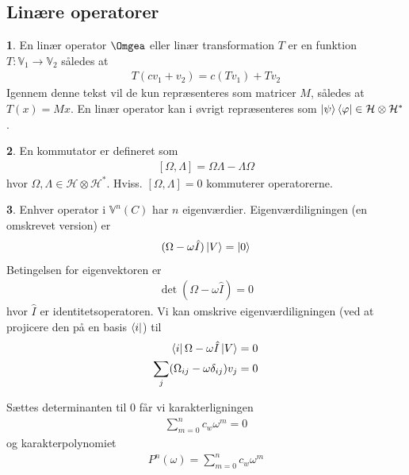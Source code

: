 \documentclass[12pt]{article}
\theoremstyle{definition}
\theoremstyle{remark}
\theoremstyle{definition}
\newtheorem{definition}{}[]
\renewcommand{\H}{\mathcal H}
\newcounter{theo}[section]\setcounter{theo}{0}
\numberwithin{equation}{section}
\begin{document}
\subsection{Linære operatorer}
\begin{definition}
En linær operator $\Omgea$ eller linær transformation $T$ er en
funktion $T:\mathbb V_1 \to \mathbb V_2$ således at
\begin{align}
  \label{eq:2}
  T(cv_1+v_2) = c(Tv_1) + Tv_2
\end{align}
Igennem denne tekst vil de kun repræsenteres som matricer $M$, således
at $T(x)=Mx$. En linær operator kan i øvrigt repræsenteres som $\ket
\psi \bra \varphi \in \mathcal H \otimes \mathcal H^*$.

\end{definition}

\begin{definition}
  En kommutator er defineret som
  \begin{align}
    \label{eq:com}
    [\Omega, \Lambda] = \Omega\Lambda - \Lambda \Omega
  \end{align}
  hvor $\Omega,\Lambda \in \H\otimes \H^*$. Hviss. $[\Omega, \Lambda]
= 0$ kommuterer operatorerne.

\end{definition}

\begin{definition}
Enhver operator i $\mathbb V^n(C)$ har $n$
eigenværdier. Eigenværdiligningen (en omskrevet version) er
\begin{align}
  \label{eq:eigen}
  (\Omega - \omega \hat I)\ket V = \ket 0
\end{align}
Betingelsen for eigenvektoren er
\begin{align}
  \label{eq:kre}
  \det(\Omega-\omega \hat I) = 0
\end{align}
hvor $\hat I$ er identitetsoperatoren. Vi kan omskrive
eigenværdiligningen (ved at projicere den på en basis $\bra i$) til
\begin{align}
  \label{eq:eig2}
  \begin{split}
   \bra i \Omega - \omega\hat I \ket V = 0 \\
   \sum_j (\Omega_{ij}-\omega \delta_{ij})v_j = 0 
  \end{split}
\end{align}

Sættes determinanten til 0 får vi karakterligningen 
\begin{align}
  \label{eq:karklig}
  \sum_{m=0}^n c_w \omega^m = 0
\end{align}
og karakterpolynomiet
\begin{align}
  \label{eq:ei}
  P^n(\omega) = \sum_{m=0}^n c_w \omega^m
\end{align}
\end{definition}
\end{document}
